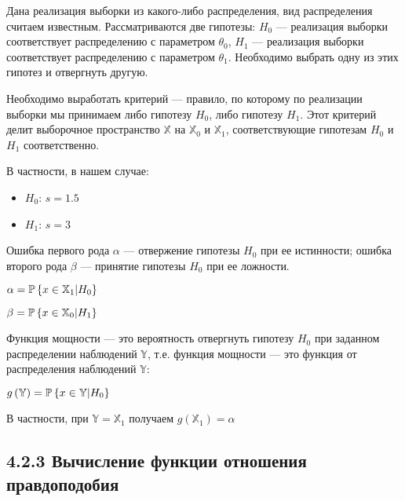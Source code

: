 \documentclass[11pt]{article}
\def\in{\mathchar"3232\nobreak\discretionary{}{\usefont{OMS}{cmsy}{m}{n}\char50}{}}
\begin{document}
    Дана реализация выборки из какого-либо распределения, вид распределения
считаем известным. Рассматриваются две гипотезы: \(H_0\) --- реализация
выборки соответствует распределению с параметром \(\theta_0\), \(H_1\) ---
реализация выборки соответствует распределению с параметром
\(\theta_1\). Необходимо выбрать одну из этих гипотез и отвергнуть
другую.

Необходимо выработать критерий --- правило, по которому по реализации
выборки мы принимаем либо гипотезу \(H_0\), либо гипотезу \(H_1\). Этот
критерий делит выборочное пространство \(\mathbb{X}\) на
\(\mathbb{X}_0\) и \(\mathbb{X}_1\), соответствующие гипотезам \(H_0\) и
\(H_1\) соответственно.

В частности, в нашем случае: 
\begin{itemize}
	\item \(H_0\): \(s=1.5\)
	\item \(H_1\): \(s=3\)
\end{itemize}

    Ошибка первого рода \(\alpha\) --- отвержение гипотезы \(H_0\) при ее
истинности; ошибка второго рода \(\beta\) --- принятие гипотезы \(H_0\)
при ее ложности.

\(\alpha=\mathbb{P}\left\{x\in\mathbb{X}_1|H_0\right\}\)

\(\beta=\mathbb{P}\left\{x\in\mathbb{X}_0|H_1\right\}\)

Функция мощности --- это вероятность отвергнуть гипотезу \(H_0\) при
заданном распределении наблюдений \(\mathbb{Y}\), т.е. функция мощности
--- это функция от распределения наблюдений \(\mathbb{Y}\):

\(g\left(\mathbb{Y}\right)=\mathbb{P}\left\{x\in\mathbb{Y}|H_0\right\}\)

В частности, при \(\mathbb{Y}=\mathbb{X}_1\) получаем
\(g\left(\mathbb{X}_1\right)=\alpha\)

    \hypertarget{ux432ux44bux447ux438ux441ux43bux435ux43dux438ux435-ux444ux443ux43dux43aux446ux438ux438-ux43eux442ux43dux43eux448ux435ux43dux438ux44f-ux43fux440ux430ux432ux434ux43eux43fux43eux434ux43eux431ux438ux44f}{%
\subsection*{4.2.3 Вычисление функции отношения
правдоподобия}\label{ux432ux44bux447ux438ux441ux43bux435ux43dux438ux435-ux444ux443ux43dux43aux446ux438ux438-ux43eux442ux43dux43eux448ux435ux43dux438ux44f-ux43fux440ux430ux432ux434ux43eux43fux43eux434ux43eux431ux438ux44f}}
\end{document}
